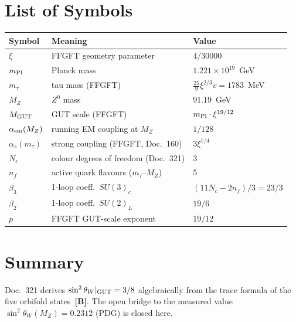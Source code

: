 
\section*{List of Symbols}

\begin{center}
\begin{tabular}{lll}
\toprule
Symbol & Meaning & Value \\
\midrule
$\xi$ & FFGFT geometry parameter & $4/30000$ \\
$m_{\rm Pl}$ & Planck mass & $1.221\times10^{19}$~GeV \\
$m_\tau$ & tau mass (FFGFT) & $\frac{25}{9}\xi^{2/3}v = 1783$~MeV \\
$M_Z$ & $Z^0$ mass & $91.19$~GeV \\
$M_{\rm GUT}$ & GUT scale (FFGFT) & $m_{\rm Pl}\cdot\xi^{19/12}$ \\
$\alpha_{\rm em}(M_Z)$ & running EM coupling at $M_Z$ & $1/128$ \\
$\alpha_s(m_\tau)$ & strong coupling (FFGFT, Doc.~160) & $3\xi^{1/4}$ \\
$N_c$ & colour degrees of freedom (Doc.~321) & $3$ \\
$n_f$ & active quark flavours ($m_\tau$--$M_Z$) & $5$ \\
$\beta_3$ & 1-loop coeff.\ $SU(3)_c$ & $(11N_c-2n_f)/3 = 23/3$ \\
$\beta_2$ & 1-loop coeff.\ $SU(2)_L$ & $19/6$ \\
$p$ & FFGFT GUT-scale exponent & $19/12$ \\
\bottomrule
\end{tabular}
\end{center}



\section*{Summary}

Doc.~321 derives $\sin^2\theta_W|_{\rm GUT} = 3/8$ algebraically
from the trace formula of the five orbifold states~\textbf{[B]}.
The open bridge to the measured value $\sin^2\theta_W(M_Z) = 0.2312$
(PDG) is closed here.

